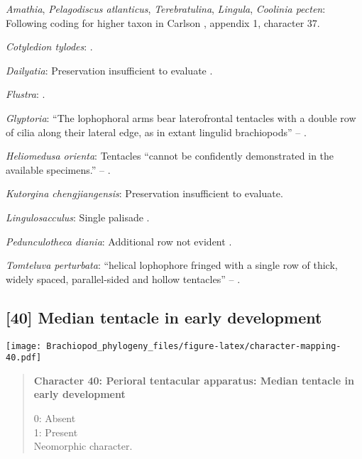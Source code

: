 \documentclass[openany]{book}
\theoremstyle{definition}
\theoremstyle{definition}
\theoremstyle{definition}
\theoremstyle{remark}
\begin{document}
\hypertarget{Amathia-coding-39}{}
\emph{Amathia}, \emph{Pelagodiscus atlanticus}, \emph{Terebratulina},
\emph{Lingula}, \emph{Coolinia pecten}: Following coding for higher
taxon in Carlson \citeyearpar{Carlson1995Phylogeneticrelationships},
appendix 1, character 37.

\hypertarget{Cotyledion_tylodes-coding-39}{}
\emph{Cotyledion tylodes}: \citet{Nielsen1966}.

\hypertarget{Dailyatia-coding-39}{}
\emph{Dailyatia}: Preservation insufficient to evaluate
\citep{Holmer2006Aspinose}.

\hypertarget{Flustra-coding-39}{}
\emph{Flustra}: \citep{Temereva2016Thenervous}.

\hypertarget{Glyptoria-coding-39}{}
\emph{Glyptoria}: ``The lophophoral arms bear laterofrontal tentacles
with a double row of cilia along their lateral edge, as in extant
lingulid brachiopods'' -- \citet{Zhang2009Architectureand}.

\hypertarget{Heliomedusa_orienta-coding-39}{}
\emph{Heliomedusa orienta}: Tentacles ``cannot be confidently
demonstrated in the available specimens.'' --
\citet{Zhang2007Rhynchonelliformeanbrachiopods}.

\hypertarget{Kutorgina_chengjiangensis-coding-39}{}
\emph{Kutorgina chengjiangensis}: Preservation insufficient to evaluate.

\hypertarget{Lingulosacculus-coding-39}{}
\emph{Lingulosacculus}: Single palisade \citep{Zhang2004Newdata}.

\hypertarget{Pedunculotheca_diania-coding-39}{}
\emph{Pedunculotheca diania}: Additional row not evident
\citep{Zhang2013}.

\hypertarget{Tomteluva_perturbata-coding-39}{}
\emph{Tomteluva perturbata}: ``helical lophophore fringed with a single
row of thick, widely spaced, parallel-sided and hollow tentacles'' --
\citet{Zhang2014Anearly}.

\subsection*{{[}40{]} Median tentacle in early
development}\label{median-tentacle-in-early-development}

\texttt{[image: Brachiopod\_phylogeny\_files/figure-latex/character-mapping-40.pdf]}

\begin{quote}
\textbf{Character 40: Perioral tentacular apparatus: Median tentacle in
early development}

0: Absent\\
1: Present\\
Neomorphic character.
\end{quote}
\end{document}
